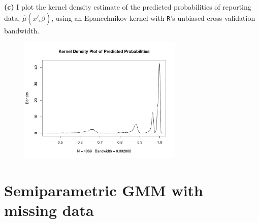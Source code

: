 \documentclass[12pt]{article}
\newcommand{\mtx}[1]{\ensuremath{\bm{\mathit{#1}}}}
\begin{document}
\textbf{(c)} I plot the kernel density estimate of the predicted probabilities of reporting data, $\hat{\mu}(\mtx{x}'_i\hat{\mtx{\beta}})$, using an Epanechnikov kernel with \verb|R|'s unbiased cross-validation bandwidth.

\begin{figure}[!htpb]
    \centering
    
        \includegraphics[width=0.7\textwidth]{kdens.pdf}

\end{figure}

\newpage


\section{Semiparametric GMM with missing data}
\end{document}
